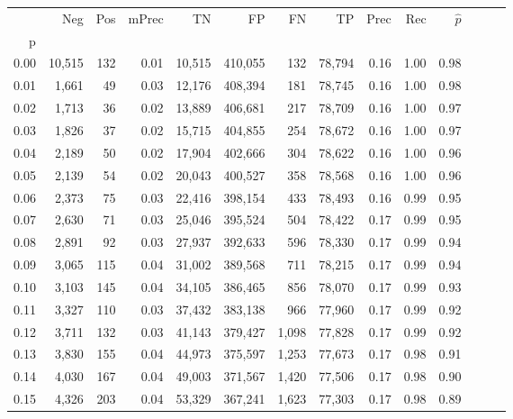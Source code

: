 \begin{tabular}{rrrrrrrrrrrrrr}
\toprule
{} &     Neg &    Pos & mPrec &       TN &       FP &      FN &      TP &  Prec &   Rec & $\hat{p}$ \\
p    &         &        &       &          &          &         &         &       &       &           \\
\midrule
0.00 &  10,515 &    132 &  0.01 &   10,515 &  410,055 &     132 &  78,794 &  0.16 &  1.00 &      0.98 \\
0.01 &   1,661 &     49 &  0.03 &   12,176 &  408,394 &     181 &  78,745 &  0.16 &  1.00 &      0.98 \\
0.02 &   1,713 &     36 &  0.02 &   13,889 &  406,681 &     217 &  78,709 &  0.16 &  1.00 &      0.97 \\
0.03 &   1,826 &     37 &  0.02 &   15,715 &  404,855 &     254 &  78,672 &  0.16 &  1.00 &      0.97 \\
0.04 &   2,189 &     50 &  0.02 &   17,904 &  402,666 &     304 &  78,622 &  0.16 &  1.00 &      0.96 \\
0.05 &   2,139 &     54 &  0.02 &   20,043 &  400,527 &     358 &  78,568 &  0.16 &  1.00 &      0.96 \\
0.06 &   2,373 &     75 &  0.03 &   22,416 &  398,154 &     433 &  78,493 &  0.16 &  0.99 &      0.95 \\
0.07 &   2,630 &     71 &  0.03 &   25,046 &  395,524 &     504 &  78,422 &  0.17 &  0.99 &      0.95 \\
0.08 &   2,891 &     92 &  0.03 &   27,937 &  392,633 &     596 &  78,330 &  0.17 &  0.99 &      0.94 \\
0.09 &   3,065 &    115 &  0.04 &   31,002 &  389,568 &     711 &  78,215 &  0.17 &  0.99 &      0.94 \\
0.10 &   3,103 &    145 &  0.04 &   34,105 &  386,465 &     856 &  78,070 &  0.17 &  0.99 &      0.93 \\
0.11 &   3,327 &    110 &  0.03 &   37,432 &  383,138 &     966 &  77,960 &  0.17 &  0.99 &      0.92 \\
0.12 &   3,711 &    132 &  0.03 &   41,143 &  379,427 &   1,098 &  77,828 &  0.17 &  0.99 &      0.92 \\
0.13 &   3,830 &    155 &  0.04 &   44,973 &  375,597 &   1,253 &  77,673 &  0.17 &  0.98 &      0.91 \\
0.14 &   4,030 &    167 &  0.04 &   49,003 &  371,567 &   1,420 &  77,506 &  0.17 &  0.98 &      0.90 \\
0.15 &   4,326 &    203 &  0.04 &   53,329 &  367,241 &   1,623 &  77,303 &  0.17 &  0.98 &      0.89 \\

\end{tabular}
